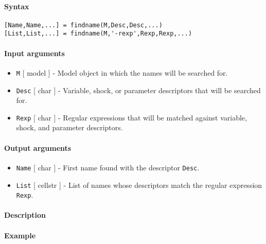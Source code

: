 


	\paragraph{Syntax}\label{syntax}

\begin{verbatim}
[Name,Name,...] = findname(M,Desc,Desc,...)
[List,List,...] = findname(M,'-rexp',Rexp,Rexp,...)
\end{verbatim}

\paragraph{Input arguments}\label{input-arguments}

\begin{itemize}
\item
  \texttt{M} {[} model {]} - Model object in which the names will be
  searched for.
\item
  \texttt{Desc} {[} char {]} - Variable, shock, or parameter descriptors
  that will be searched for.
\item
  \texttt{Rexp} {[} char {]} - Regular expressions that will be matched
  against variable, shock, and parameter descriptors.
\end{itemize}

\paragraph{Output arguments}\label{output-arguments}

\begin{itemize}
\item
  \texttt{Name} {[} char {]} - First name found with the descriptor
  \texttt{Desc}.
\item
  \texttt{List} {[} cellstr {]} - List of names whose descriptors match
  the regular expression \texttt{Rexp}.
\end{itemize}

\paragraph{Description}\label{description}

\paragraph{Example}\label{example}


